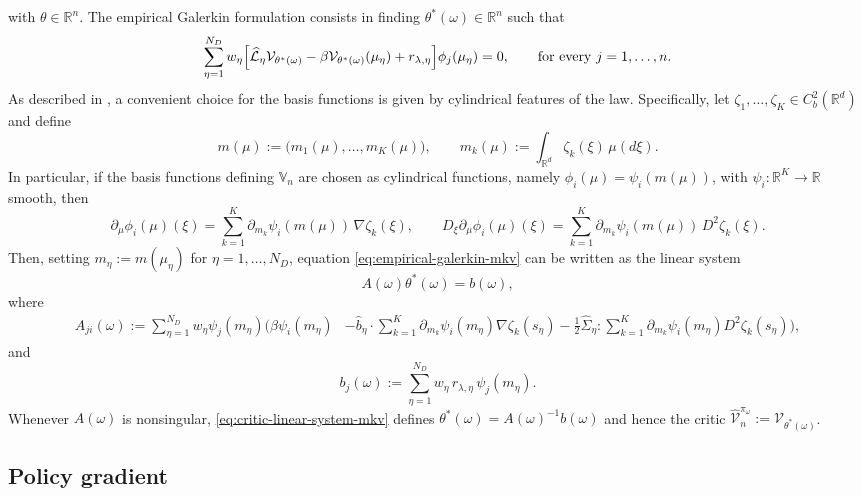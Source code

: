 \documentclass[a4paper, 10pt, english, reqno]{amsart}
\begin{document}
with $\theta\in\mathbb R^n$. The empirical Galerkin formulation consists
in finding $\theta^*(\omega)\in\mathbb R^n$ such that
\begin{equation}\label{eq:empirical-galerkin-mkv}
  \sum_{\eta=1}^{N_D}
  w_\eta
  \Bigl[
    \widehat{\mathcal L}_\eta\mathcal V_{\theta^*(\omega)}
    -
    \beta\mathcal V_{\theta^*(\omega)}(\mu_\eta)
    +
    r_{\lambda,\eta}
  \Bigr]
  \phi_j(\mu_\eta)
  =
  0,\qquad\text{for every }j=1,\dots,n.
\end{equation}
As described in \cite[Section~5]{firstpaper}, a convenient choice for
the basis functions is given by cylindrical features of the law. Specifically, let
$\zeta_1,\dots,\zeta_K\in C_b^2(\mathbb R^d)$ and define
\[
  m(\mu)
  :=
  \bigl(m_1(\mu),\dots,m_K(\mu)\bigr),
  \qquad
  m_k(\mu)
  :=
  \int_{\mathbb R^d}\zeta_k(\xi)\,\mu(d\xi).
\]
In particular, if the basis functions defining $\mathbb V_n$ are chosen
as cylindrical functions, namely
$\phi_i(\mu)=\psi_i(m(\mu))$, with
$\psi_i:\mathbb R^K\to\mathbb R$ smooth, then
\[
  \partial_\mu\phi_i(\mu)(\xi)
  =
  \sum_{k=1}^K
  \partial_{m_k}\psi_i(m(\mu))\,\nabla\zeta_k(\xi),
  \qquad
  D_\xi\partial_\mu\phi_i(\mu)(\xi)
  =
  \sum_{k=1}^K
  \partial_{m_k}\psi_i(m(\mu))\,D^2\zeta_k(\xi).
\]
Then, setting $m_\eta:=m(\mu_\eta)$ for $\eta=1,\dots,N_D$, equation
\eqref{eq:empirical-galerkin-mkv} can be written as the linear system
\begin{equation}\label{eq:critic-linear-system-mkv}
  A(\omega)\theta^*(\omega)=b(\omega),
\end{equation}
where
\[
\begin{aligned}
  A_{ji}(\omega)
  :=
  \sum_{\eta=1}^{N_D}
  w_\eta
  \psi_j(m_\eta)
  \bigg(
    \beta\psi_i(m_\eta)
    &-
    \widehat b_\eta\cdot
    \sum_{k=1}^K
    \partial_{m_k}\psi_i(m_\eta)\nabla\zeta_k(s_\eta)-
    \frac12\widehat\Sigma_\eta:
    \sum_{k=1}^K
    \partial_{m_k}\psi_i(m_\eta)D^2\zeta_k(s_\eta)
  \bigg),
\end{aligned}
\]
and
\[
  b_j(\omega)
  :=
  \sum_{\eta=1}^{N_D}
  w_\eta\,
  r_{\lambda,\eta}\,
  \psi_j(m_\eta).
\]
Whenever $A(\omega)$ is nonsingular,
\eqref{eq:critic-linear-system-mkv} defines
$\theta^*(\omega)=A(\omega)^{-1}b(\omega)$ and hence the critic
$\hat{\mathcal V}^{\pi_\omega}_n
:=
\mathcal V_{\theta^*(\omega)}$. 
\subsection{Policy gradient}
\label{subsec:actor-algorithm}
\end{document}
